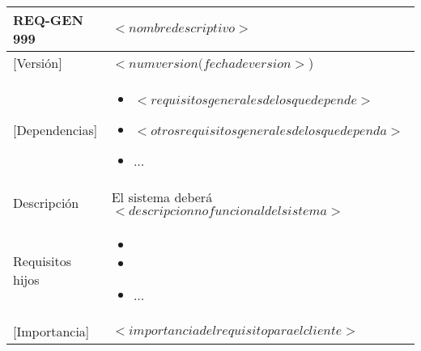 \begin{Artefacto}[H]
    \centering
    \begin{tabular}{|p{3cm}|p{10cm}|}
        \hline
         \cellcolor{gray30}  REQ-GEN 999	&  $<nombre descriptivo>$\\ 
        \hline
         \cellcolor{gray30}  [Versión]	&  $<num version(fecha de version>$)\\   
         \hline
         \cellcolor{gray30}  [Dependencias] &  	\begin{itemize} 	\item $<requisitos generales de los que depende>$
\item $<otros requisitos generales de los que dependa>$
\item	... \end{itemize}\\  
        \hline
         \cellcolor{gray30} Descripción	&El sistema deberá  $<descripcion no funcional del sistema>$\\
          \hline
         \cellcolor{gray30}  Requisitos hijos&  	\begin{itemize} 	\item 
                                                                                           \item 
																	\item	... \end{itemize}\\  
        \hline          
           \cellcolor{gray30}[Importancia]	& $<importancia del requisito para el cliente>$  \\

\end{tabular}
\end{Artefacto}
